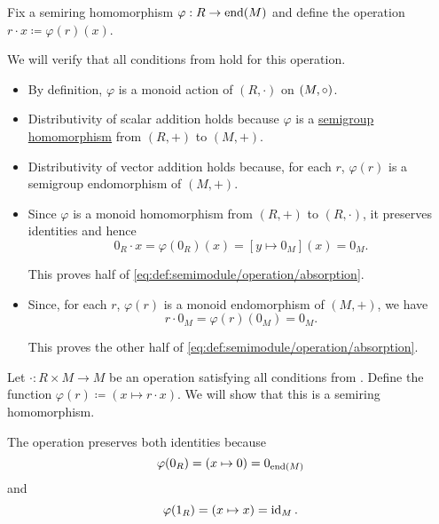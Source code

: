 \begin{defproof}
   Fix a semiring homomorphism \( \varphi: R \to \operatorname{end}(M) \) and define the operation \( r \cdot x \coloneqq \varphi(r)(x) \).

  We will verify that all conditions from  hold for this operation.

  \begin{itemize}
    \item By definition, \( \varphi \) is a monoid action of \( (R, \cdot) \) on \( (M, \bincirc) \).

    \item Distributivity of scalar addition holds because \( \varphi \) is a \hyperref[def:semigroup/homomorphism]{semigroup homomorphism} from \( (R, +) \) to \( (M, +) \).

    \item Distributivity of vector addition holds because, for each \( r \), \( \varphi(r) \) is a semigroup endomorphism of \( (M, +) \).

    \item Since \( \varphi \) is a monoid homomorphism from \( (R,  +) \) to \( (R, \cdot) \), it preserves identities and hence
    \begin{equation*}
      0_R \cdot x = \varphi(0_R)(x) = [y \mapsto 0_M](x) = 0_M.
    \end{equation*}

    This proves half of \eqref{eq:def:semimodule/operation/absorption}.

    \item Since, for each \( r \), \( \varphi(r) \) is a monoid endomorphism of \( (M, +) \), we have
    \begin{equation*}
      r \cdot 0_M = \varphi(r)(0_M) = 0_M.
    \end{equation*}

    This proves the other half of \eqref{eq:def:semimodule/operation/absorption}.
  \end{itemize}

   Let \( \cdot: R \times M \to M \) be an operation satisfying all conditions from . Define the function \( \varphi(r) \coloneqq (x \mapsto r \cdot x) \). We will show that this is a semiring homomorphism.

  The operation preserves both identities because
  \begin{equation*}
    \varphi(0_R) = (x \mapsto 0) = 0_{\operatorname{end}(M)}
  \end{equation*}
  and
  \begin{equation*}
    \varphi(1_R) = (x \mapsto x) = \operatorname{id}_M.
  \end{equation*}


\end{defproof}
